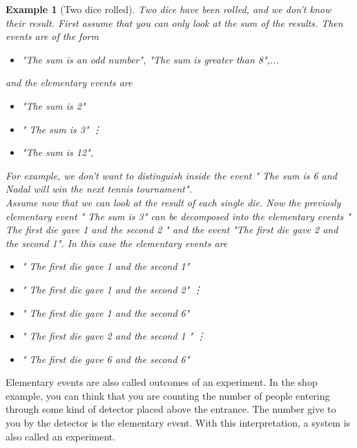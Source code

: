 \documentclass[12pt]{article}
\newtheorem{example}[theorem]{Example}
\newcommand{\<}{{\langle \!\! \langle}}
\renewcommand{\>}{{\rangle \!\! \rangle}}
\newcommand{\commento}[1]{
	\par\noindent
	\colorbox{light}{\begin{minipage}{120 mm}#1\end{minipage}}
	\par\noindent
}
\begin{document}
\begin{example}[Two dice rolled]
Two dice have been rolled, and we don't know their result. First assume that you can only look at the sum of the results.  Then events are of the form 
\begin{itemize}

	\item "The sum is an odd number", "The sum is greater than 8",...

\end{itemize}
and the elementary events are 

\begin{itemize}

	\item "The sum is 2" 
	\item " The sum is 3"
		\vdots
	\item "The sum is 12",

\end{itemize}
 For example, we don't want to distinguish inside the event " The sum is 6 and Nadal will win the next tennis tournament". \\
 
Assume now that we can look at the result of each single die. Now the previosly elementary event " The sum is 3" can be decomposed into the elementary events " The first die gave 1 and the second 2 " and the event "The first die gave 2 and the second 1". 
In this case the elementary events are
\begin{itemize}

	\item " The first die gave 1 and the second 1"
	\item " The first die gave 1 and the second 2"
	\vdots
	\item  " The first die gave 1 and the second 6" 
	\item " The first die gave 2 and the second 1 "
	\vdots
	\item " The first die gave 6 and the second 6"   
\end{itemize}

\end{example} 

\commento{ Elementary events are also called outcomes of an experiment. In the shop example, you can think that you are counting the number of people entering through some kind of detector placed above the entrance. The number give to you by the detector is the elementary event. With this interpretation, a system is also called an experiment. }
\end{document}
